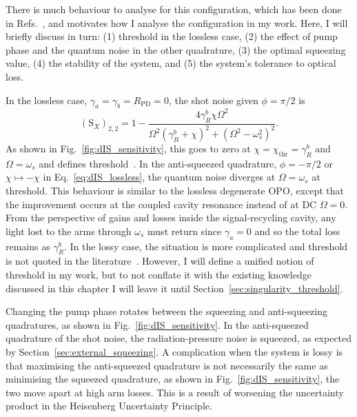 There is much behaviour to analyse for this configuration, which has been done in Refs.~\cite{Korobko2019,Adya2020,Korobko}, and motivates how I analyse the configuration in my work. Here, I will briefly discuss in turn: (1) threshold in the lossless case, (2) the effect of pump phase and the quantum noise in the other quadrature, (3) the optimal squeezing value, (4) the stability of the system, and (5) the system's tolerance to optical loss.

In the lossless case, $\gamma_a=\gamma_b=R_\text{PD}=0$, the shot noise given $\phi=\pi/2$ is 
\begin{equation}
\label{eq:dIS_lossless}
(\text{S}_X)_{2,2}=1-\frac{4 \gamma^b_R \chi \Omega ^2}{\Omega ^2 (\gamma^b_R+\chi )^2+(\Omega ^2-\omega_s^2)^2}.
\end{equation}
As shown in Fig.~\ref{fig:dIS_sensitivity}, this goes to zero at $\chi=\chi_\text{thr}=\gamma^b_R$ and $\Omega=\omega_s$ and defines threshold~\cite{}. In the anti-squeezed quadrature, $\phi=-\pi/2$ or $\chi\mapsto-\chi$ in Eq.~\ref{eq:dIS_lossless}, the quantum noise diverges at $\Omega=\omega_s$ at threshold. This behaviour is similar to the lossless degenerate OPO, except that the improvement occurs at the coupled cavity resonance instead of at DC $\Omega=0$. From the perspective of gains and losses inside the signal-recycling cavity, any light lost to the arms through $\omega_s$ must return since $\gamma_a=0$ and so the total loss remains as $\gamma^b_R$. In the lossy case, the situation is more complicated and threshold is not quoted in the literature~\cite{}. However, I will define a unified notion of threshold in my work, but to not conflate it with the existing knowledge discussed in this chapter I will leave it until Section~\ref{sec:singularity_threshold}. 

Changing the pump phase rotates between the squeezing and anti-squeezing quadratures, as shown in Fig.~\ref{fig:dIS_sensitivity}. In the anti-squeezed quadrature of the shot noise, the radiation-pressure noise is squeezed, as expected by Section~\ref{sec:external_squeezing}.
A complication when the system is lossy is that maximising the anti-squeezed quadrature is not necessarily the same as minimising the squeezed quadrature, as shown in Fig.~\ref{fig:dIS_sensitivity}, the two move apart at high arm losses. This is a result of worsening the uncertainty product in the Heisenberg Uncertainty Principle. 

